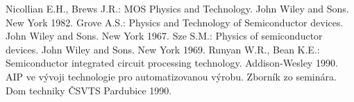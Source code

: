 \begin{thebibliography}{}
Nicollian E.H., Brews J.R.: MOS Physics  and  Technology. John Wiley and Sons. New York 1982.
Grove A.S.: Physics and Technology of Semiconductor devices. John Wiley and Sons. New York 1967.
Sze S.M.: Physics of semiconductor devices. John Wiley and Sons. New York 1969.
Runyan W.R., Bean K.E.: Semiconductor integrated circuit  processing technology. Addison-Wesley 1990.
AIP ve vývoji technologie pro automatizovanou výrobu. Zborník zo seminára. Dom techniky ČSVTS Pardubice 1990.
\end{thebibliography}
